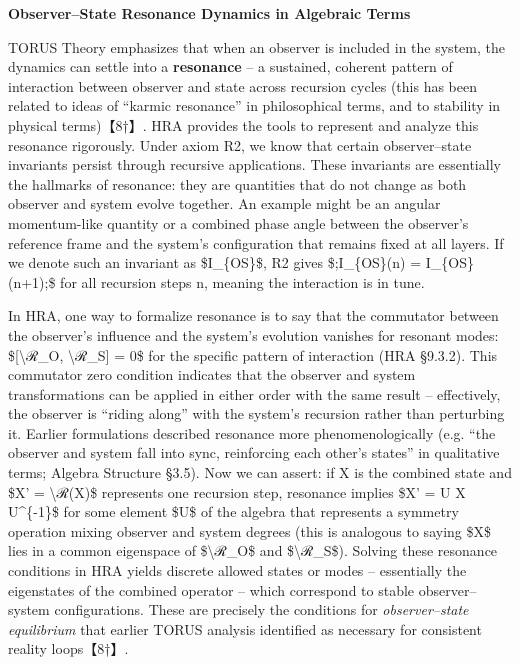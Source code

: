 \documentclass[]{article}
\begin{document}
\textbf{Observer--State Resonance Dynamics in Algebraic Terms}

TORUS Theory emphasizes that when an observer is included in the system,
the dynamics can settle into a \textbf{resonance} -- a sustained,
coherent pattern of interaction between observer and state across
recursion cycles (this has been related to ideas of ``karmic resonance''
in philosophical terms, and to stability in physical terms)【8†】. HRA
provides the tools to represent and analyze this resonance rigorously.
Under axiom R2, we know that certain observer--state invariants persist
through recursive applications. These invariants are essentially the
hallmarks of resonance: they are quantities that do not change as both
observer and system evolve together. An example might be an angular
momentum-like quantity or a combined phase angle between the observer's
reference frame and the system's configuration that remains fixed at all
layers. If we denote such an invariant as \$I\_\{OS\}\$, R2 gives
\$;I\_\{OS\}(n) = I\_\{OS\}(n+1);\$ for all recursion steps n, meaning
the interaction is in tune.

In HRA, one way to formalize resonance is to say that the commutator
between the observer's influence and the system's evolution vanishes for
resonant modes: \${[}\textbackslash{}ℛ\_O, \textbackslash{}ℛ\_S{]} = 0\$
for the specific pattern of interaction (HRA §9.3.2). This commutator
zero condition indicates that the observer and system transformations
can be applied in either order with the same result -- effectively, the
observer is ``riding along'' with the system's recursion rather than
perturbing it. Earlier formulations described resonance more
phenomenologically (e.g. ``the observer and system fall into sync,
reinforcing each other's states'' in qualitative terms; Algebra
Structure §3.5). Now we can assert: if X is the combined state and \$X'
= \textbackslash{}ℛ(X)\$ represents one recursion step, resonance
implies \$X' = U X U\^{}\{-1\}\$ for some element \$U\$ of the algebra
that represents a symmetry operation mixing observer and system degrees
(this is analogous to saying \$X\$ lies in a common eigenspace of
\$\textbackslash{}ℛ\_O\$ and \$\textbackslash{}ℛ\_S\$). Solving these
resonance conditions in HRA yields discrete allowed states or modes --
essentially the eigenstates of the combined operator -- which correspond
to stable observer--system configurations. These are precisely the
conditions for \emph{observer--state equilibrium} that earlier TORUS
analysis identified as necessary for consistent reality loops【8†】.
\end{document}
